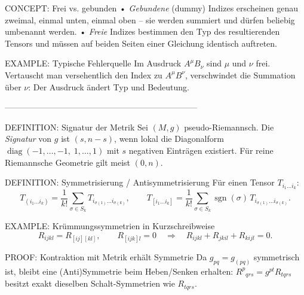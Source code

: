 \documentclass[10pt, letterpaper]{article}
\begin{document}
CONCEPT: Frei vs. gebunden  
• \emph{Gebundene} (dummy) Indizes erscheinen genau zweimal, einmal
unten, einmal oben – sie werden summiert und dürfen beliebig
umbenannt werden.  
• \emph{Freie} Indizes bestimmen den Typ des resultierenden Tensors und
müssen auf beiden Seiten einer Gleichung identisch auftreten.

EXAMPLE: Typische Fehlerquelle  
Im Ausdruck $A^\mu B_\nu$ sind $\mu$ und $\nu$ frei. Vertauscht man
versehentlich den Index zu $A^\mu B^\nu$, verschwindet die Summation
über $\nu$: Der Ausdruck ändert Typ und Bedeutung.

---------------------------------------------------------------------


DEFINITION: Signatur der Metrik  
Sei $(M,g)$ pseudo-Riemannsch. Die \emph{Signatur} von $g$ ist
$(s,n\!-\!s)$, wenn lokal die Diagonalform
$\operatorname{diag}(-1,\dots,-1,\;1,\dots,1)$ mit $s$ negativen
Einträgen existiert. Für reine Riemannsche Geometrie gilt meist
$(0,n)$.

DEFINITION: Symmetrisierung / Antisymmetrisierung  
Für einen Tensor $T_{i_1\dots i_k}$:  
\[
T_{(i_1\dots i_k)}
=\frac{1}{k!}\sum_{\sigma\in S_k}T_{i_{\sigma(1)}\dots i_{\sigma(k)}},
\qquad
T_{[i_1\dots i_k]}
=\frac{1}{k!}\sum_{\sigma\in S_k}
\operatorname{sgn}(\sigma)\,
T_{i_{\sigma(1)}\dots i_{\sigma(k)}}.
\]

EXAMPLE: Krümmungssymmetrien in Kurzschreibweise  
\[
R_{ijkl}=R_{[ij][kl]},\qquad
R_{[ijk]l}=0
\quad\Rightarrow\quad
R_{ijkl}+R_{jkil}+R_{kijl}=0.
\]

PROOF: Kontraktion mit Metrik erhält Symmetrie  
Da $g_{pq}=g_{(pq)}$ symmetrisch ist, bleibt eine (Anti)Symmetrie beim
Heben/Senken erhalten: $R^{p}{}_{qrs}=g^{pt}R_{tqrs}$ besitzt exakt
dieselben Schalt-Symmetrien wie $R_{tqrs}$.





\pagebreak
\printbibliography
\end{document}
